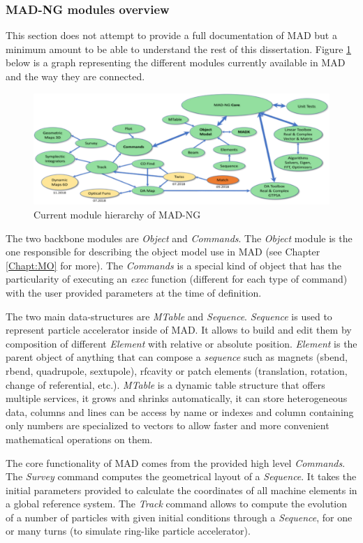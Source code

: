 \subsubsection{MAD-NG modules overview}
\label{Subsec:mad-doc}

This section does not attempt to provide a full documentation of MAD but a
minimum amount to be able to understand the rest of this dissertation.
Figure \ref{fig:mad-graph} below is a graph representing the different
modules currently available in MAD and the way they are connected.

\begin{figure}[H]
    \centering
	\includegraphics[width=\textwidth]{./Images/mad-graph.pdf}
    \caption{Current module hierarchy of MAD-NG}
    \label{fig:mad-graph}
\end{figure}

The two backbone modules are \emph{Object} and \emph{Commands}. The \emph{Object}
module is the one responsible for describing the object model use in MAD (see
Chapter \ref{Chapt:MO} for more). The \emph{Commands} is a special kind of
object that has the particularity of executing an \emph{exec} function
(different for each type of command) with the user provided parameters at the
time of definition.

The two main data-structures are \emph{MTable} and \emph{Sequence}.
\emph{Sequence} is used to represent particle accelerator inside of MAD.
It allows to build and edit them by
composition of different \emph{Element} with relative or absolute position.
\emph{Element} is the parent object of anything that can compose a
\emph{sequence} such as magnets (sbend, rbend, quadrupole, sextupole),
rfcavity or patch elements (translation, rotation, change of referential,
etc.). \emph{MTable} is a dynamic table structure that offers multiple
services, it grows and shrinks automatically, it can store heterogeneous data,
columns and lines can be access by name or indexes and column containing only
numbers are specialized to vectors to allow faster and more convenient
mathematical operations on them.

The core functionality of MAD comes from the provided high level \emph{Commands}.
The \emph{Survey} command computes the geometrical layout of a \emph{Sequence}.
It takes the initial parameters provided to calculate the coordinates of all
machine elements in a global reference system. The \emph{Track} command allows
to compute the evolution of a number of particles with given initial conditions
through a \emph{Sequence}, for one or many turns (to simulate ring-like particle
accelerator).